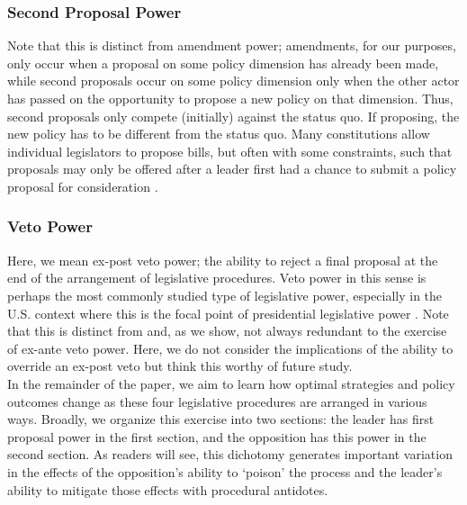 \documentclass[12pt]{article}
\theoremstyle{plain}		      \newtheorem{assn}{Assumption}
\theoremstyle{plain}		      \newtheorem{prop}{Proposition}
\theoremstyle{plain}		      \newtheorem{lemma}{Lemma}
\theoremstyle{plain}	          \newtheorem{imp}{Implication}
\theoremstyle{plain}	          \newtheorem{hyp}{Hypothesis}
\theoremstyle{definition}		  \newtheorem{defn}{Definition}
\theoremstyle{remark}	          \newtheorem{rem}{Remark}
\theoremstyle{definition}         \newtheorem{case}{Case}
\begin{document}
\subsubsection{Second Proposal Power}
\indent Note that this is distinct from amendment power; amendments, for our purposes, only occur when a proposal on some policy dimension has already been made, while second proposals occur on some policy dimension only when the other actor has passed on the opportunity to propose a new policy on that dimension. Thus, second proposals only compete (initially) against the status quo. If proposing, the new policy has to be different from the status quo. Many constitutions allow individual legislators to propose bills, but often with some constraints, such that proposals may only be offered after a leader first had a chance to submit a policy proposal for consideration \citet{barkan08}.   
\subsubsection{Veto Power}
\indent Here, we mean ex-post veto power; the ability to reject a final proposal at the end of the arrangement of legislative procedures. Veto power in this sense is perhaps the most commonly studied type of legislative power, especially in the U.S. context where this is the focal point of presidential legislative power \citep{krehbiel99, tsebelis02}. Note that this is distinct from and, as we show, not always redundant to the exercise of ex-ante veto power. Here, we do not consider the implications of the ability to override an ex-post veto but think this worthy of future study.
\\
\indent In the remainder of the paper, we aim to learn how optimal strategies and policy outcomes change as these four legislative procedures are arranged in various ways. Broadly, we organize this exercise into two sections:  the leader has first proposal power in the first section, and the opposition has this power in the second section. As readers will see, this dichotomy generates important variation in the effects of the opposition's ability to `poison' the process and the leader's ability to mitigate those effects with procedural antidotes.
\end{document}
